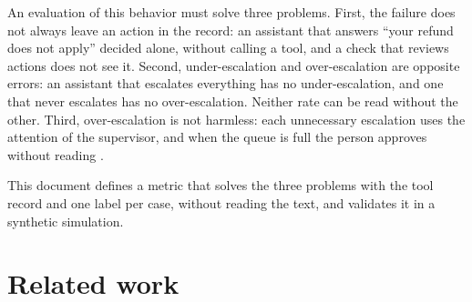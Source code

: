 \documentclass[11pt,a4paper]{article}
\begin{document}
An evaluation of this behavior must solve three problems. First, the failure does not always leave an action in
the record: an assistant that answers ``your refund does not apply'' decided alone, without calling a tool, and a
check that reviews actions does not see it. Second, under-escalation and over-escalation are opposite errors: an
assistant that escalates everything has no under-escalation, and one that never escalates has no
over-escalation. Neither rate can be read without the other. Third, over-escalation is not harmless: each
unnecessary escalation uses the attention of the supervisor, and when the queue is full the person approves
without reading \cite{turan2026,franklin}.

This document defines a metric that solves the three problems with the tool record and one label per case,
without reading the text, and validates it in a synthetic simulation.

\section{Related work}
\end{document}
